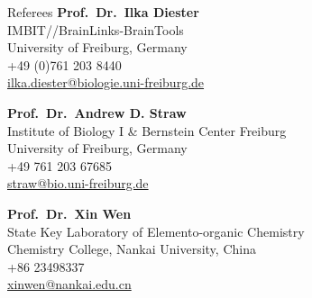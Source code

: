 \begin{rSection}{Referees}
    {\bf Prof.\ Dr.\ Ilka Diester}
    \\ {IMBIT//BrainLinks-BrainTools}
    \\ {University of Freiburg, Germany}
    \\ +49 (0)761 203 8440
    \\ \href{mailto: ilka.diester@biologie.uni-freiburg.de}{ilka.diester@biologie.uni-freiburg.de}

    {\bf Prof.\ Dr.\ Andrew D. Straw}
    \\ {Institute of Biology I \& Bernstein Center Freiburg}
    \\ {University of Freiburg, Germany}
    \\ +49 761 203 67685
    \\ \href{mailto: straw@bio.uni-freiburg.de}{straw@bio.uni-freiburg.de}

    {\bf Prof.\ Dr.\ Xin Wen}
    \\ {State Key Laboratory of Elemento-organic Chemistry}
    \\ {Chemistry College, Nankai University, China}
    \\ +86 23498337
    \\ \href{mailto: xinwen@nankai.edu.cn}{xinwen@nankai.edu.cn}
      


\end{rSection}